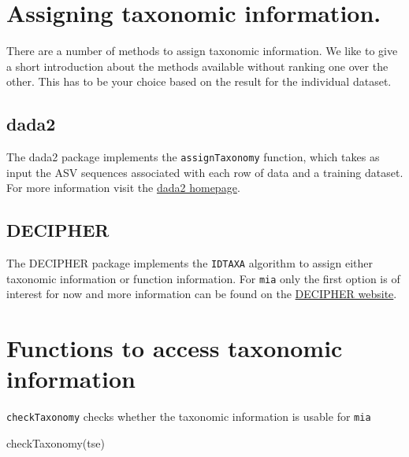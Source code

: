 \documentclass[
]{book}
\newenvironment{Shaded}{\begin{snugshade}}{\end{snugshade}}
\newcommand{\FunctionTok}[1]{\textcolor[rgb]{0.00,0.00,0.00}{#1}}
\newcommand{\NormalTok}[1]{#1}
\begin{document}
\hypertarget{assigning-taxonomic-information.}{%
\section{Assigning taxonomic information.}\label{assigning-taxonomic-information.}}

There are a number of methods to assign taxonomic information. We like to give
a short introduction about the methods available without ranking one over the
other. This has to be your choice based on the result for the individual
dataset.

\hypertarget{dada2}{%
\subsection{dada2}\label{dada2}}

The dada2 package \citep{Callahan2016dada2} implements the \texttt{assignTaxonomy}
function, which takes as input the ASV sequences associated with each
row of data and a training dataset. For more information visit the
\href{https://benjjneb.github.io/dada2/assign.html}{dada2 homepage}.

\hypertarget{decipher}{%
\subsection{DECIPHER}\label{decipher}}

The DECIPHER package \citep{R-DECIPHER} implements the \texttt{IDTAXA} algorithm to assign
either taxonomic information or function information. For \texttt{mia}
only the first option is of interest for now and more information can be
found on the \href{http://www2.decipher.codes/Classification.html}{DECIPHER website}.

\hypertarget{functions-to-access-taxonomic-information}{%
\section{Functions to access taxonomic information}\label{functions-to-access-taxonomic-information}}

\texttt{checkTaxonomy} checks whether the taxonomic information is usable for \texttt{mia}

\begin{Shaded}
\begin{Highlighting}[]
\FunctionTok{checkTaxonomy}\NormalTok{(tse)}
\end{Highlighting}
\end{Shaded}
\end{document}
